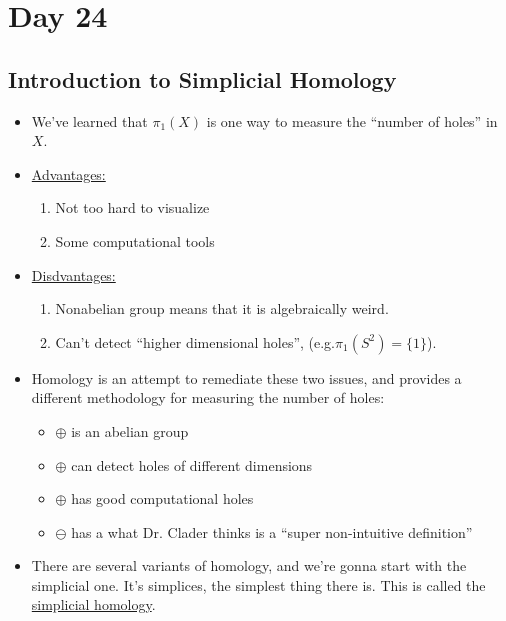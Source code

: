 \documentclass[../notes.tex]{subfiles}
\begin{document}
\section{Day 24}
\subsection{Introduction to Simplicial Homology}
\begin{itemize}
    \item We've learned that $\pi_1(X)$ is one way to measure the ``number of holes'' in $X$.
    \item \underline{Advantages:}
        \begin{enumerate}
            \item Not too hard to visualize
            \item Some computational tools
        \end{enumerate}
    \item \underline{Disdvantages:}
        \begin{enumerate}
            \item Nonabelian group means that it is algebraically weird.
            \item Can't detect ``higher dimensional holes'',
                (e.g.$\pi_1(S^2)=\{1\}$).
        \end{enumerate}
    \item Homology is an attempt to remediate these two issues, and provides
        a different methodology for measuring the number of holes:
        \begin{itemize}
            \item $\oplus$ is an abelian group
            \item $\oplus$ can detect holes of different dimensions
            \item $\oplus$ has good computational holes
            \item $\ominus$ has a what Dr. Clader thinks is a 
                ``super non-intuitive definition''
        \end{itemize}
    \item There are several variants of homology, and we're gonna start with the
        simplicial one. It's simplices, the simplest thing there is. This
        is called the \underline{simplicial homology}.
\end{itemize}
\end{document}
